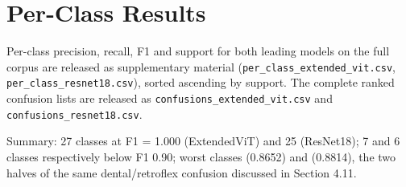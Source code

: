 \hypertarget{appendix-c.-per-class-results}{%
\section{Per-Class
Results}\label{appendix-c.-per-class-results}}

Per-class precision, recall, F1 and support for both leading models on
the full corpus are released as supplementary material
(\texttt{per\_class\_extended\_vit.csv},
\texttt{per\_class\_resnet18.csv}), sorted ascending by support. The
complete ranked confusion lists are released as
\texttt{confusions\_extended\_vit.csv} and
\texttt{confusions\_resnet18.csv}.

Summary: 27 classes at F1 = 1.000 (ExtendedViT) and 25 (ResNet18); 7 and
6 classes respectively below F1 0.90; worst classes  (0.8652) and 
(0.8814), the two halves of the same dental/retroflex confusion
discussed in Section 4.11.

